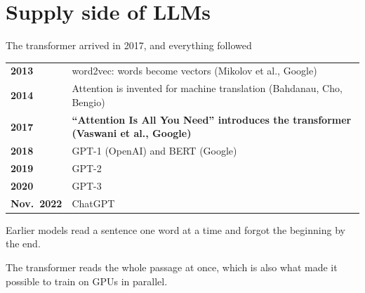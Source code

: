 \documentclass[aspectratio=169,11pt]{beamer}
\begin{document}
\section{Supply side of LLMs}


\begin{frame}{The transformer arrived in 2017, and everything followed}

\begin{center}
\footnotesize
\begin{tabular}{@{}ll@{}}
\toprule
\textbf{2013} & word2vec: words become vectors (Mikolov et al., Google) \\
\textbf{2014} & Attention is invented for machine translation (Bahdanau, Cho, Bengio) \\
\textbf{2017} & \textcolor{mitcardinal}{\textbf{``Attention Is All You Need'' introduces the transformer (Vaswani et al., Google)}} \\
\textbf{2018} & GPT-1 (OpenAI) and BERT (Google) \\
\textbf{2019} & GPT-2 \\
\textbf{2020} & GPT-3 \\
\textbf{Nov.\ 2022} & ChatGPT \\
\bottomrule
\end{tabular}
\end{center}

\vspace{0.4cm}

Earlier models read a sentence one word at a time and forgot the beginning by the end.

\vspace{0.25cm}

\alert{The transformer reads the whole passage at once, which is also what made it possible to train on GPUs in parallel.}

\end{frame}
\end{document}
